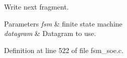 \-Write next fragment. 


\begin{DoxyParams}{\-Parameters}
{\em fsm} & finite state machine \\
\hline
{\em datagram} & \-Datagram to use. \\
\hline
\end{DoxyParams}


\-Definition at line 522 of file fsm\-\_\-soe.\-c.

